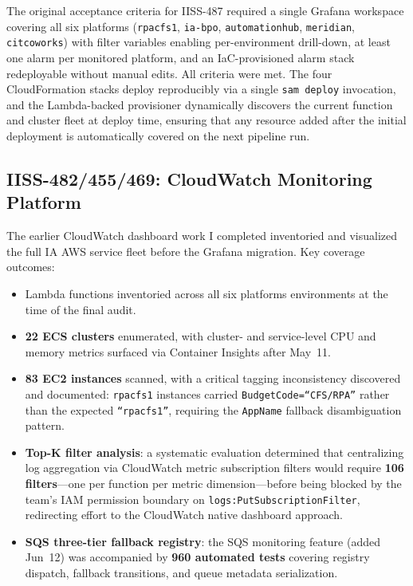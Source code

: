 The original acceptance criteria for IISS-487 required a single Grafana workspace
covering all six platforms (\texttt{rpacfs1}, \texttt{ia-bpo},
\texttt{automationhub}, \texttt{meridian}, \texttt{citcoworks}) with filter
variables enabling per-environment drill-down, at least one alarm per monitored
platform, and an IaC-provisioned alarm stack redeployable without manual edits.
All criteria were met. The four CloudFormation stacks deploy reproducibly via a
single \texttt{sam deploy} invocation, and the Lambda-backed provisioner
dynamically discovers the current function and cluster fleet at deploy time,
ensuring that any resource added after the initial deployment is automatically
covered on the next pipeline run.

\subsection{IISS-482/455/469: CloudWatch Monitoring Platform}

The earlier CloudWatch dashboard work I completed inventoried and visualized the full IA
AWS service fleet before the Grafana migration. Key coverage outcomes:

\begin{itemize}
    \item Lambda functions inventoried across all six platforms
          environments at the time of the final audit.
    \item \textbf{22 ECS clusters} enumerated, with cluster- and service-level
          CPU and memory metrics surfaced via Container Insights after May~11.
    \item \textbf{83 EC2 instances} scanned, with a critical tagging
          inconsistency discovered and documented: \texttt{rpacfs1} instances
          carried \texttt{BudgetCode=``CFS/RPA''} rather than the expected
          \texttt{``rpacfs1''}, requiring the \texttt{AppName} fallback
          disambiguation pattern.
    \item \textbf{Top-K filter analysis}: a systematic evaluation determined
          that centralizing log aggregation via CloudWatch metric subscription
          filters would require \textbf{106 filters}---one per function per
          metric dimension---before being blocked by the team's IAM permission
          boundary on \texttt{logs:PutSubscriptionFilter}, redirecting effort
          to the CloudWatch native dashboard approach.
    \item \textbf{SQS three-tier fallback registry}: the SQS monitoring
          feature (added Jun~12) was accompanied by \textbf{960 automated
          tests} covering registry dispatch, fallback transitions, and queue
          metadata serialization.
\end{itemize}

